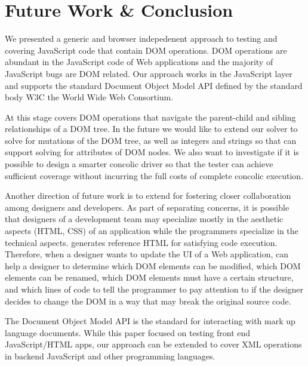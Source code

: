 \section{Future Work \& Conclusion}
We presented a generic and browser indepedenent approach to testing and covering JavaScript code that contain DOM operations.  
DOM operations are abundant in the JavaScript code of Web applications and the majority of JavaScript bugs are DOM related.  
Our approach works in the JavaScript layer and supports the standard Document Object Model API defined by the standard body W3C the World Wide Web Consortium.  

At this stage \tool covers DOM operations that navigate the parent-child and sibling relationships of a DOM tree.  
In the future we would like to extend our solver to solve for mutations of the DOM tree, as well as integers and strings so that \tool can support solving for attributes of DOM nodes.    
We also want to investigate if it is possible to design a smarter concolic driver so that the tester can achieve sufficient coverage without incurring the full costs of complete concolic execution.

Another direction of future work is to extend \tool for fostering closer collaboration among designers and developers.
As part of separating concerns, it is possible that designers of a development team may specialize mostly in the aesthetic aspects (HTML, CSS) of an application while the programmers specialize in the technical aspects.    
\tool generates reference HTML for satisfying code execution.  
Therefore, when a designer wants to update the UI of a Web application, \tool can help a designer to determine 
which DOM elements can be modified, 
which DOM elements can be renamed, 
which DOM elements must have a certain structure, 
and which lines of code to tell the programmer to pay attention to if the designer decides to change the DOM in a way that may break the original source code.  

The Document Object Model API is the standard for interacting with mark up language documents.  
While this paper focused on testing front end JavaScript/HTML apps, our approach can be extended to cover XML operations in backend JavaScript and other programming languages.  
